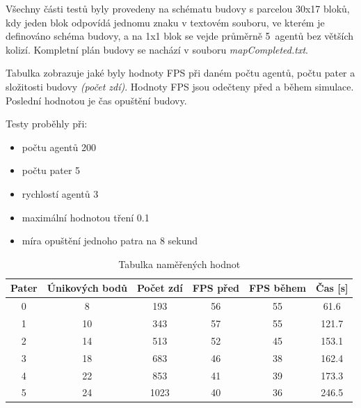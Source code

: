 \documentclass[czech,public,dept460,male,cpdeclaration]{diploma}
\begin{document}
Všechny části testů byly provedeny na schématu budovy s parcelou 30x17 bloků, kdy jeden blok odpovídá jednomu znaku v textovém souboru, ve kterém je definováno schéma budovy, a na 1x1 blok se vejde průměrně 5~agentů bez větších kolizí. Kompletní plán budovy se nachází v souboru \textit{mapCompleted.txt}.

Tabulka zobrazuje jaké byly hodnoty FPS při daném počtu agentů, počtu pater a složitosti budovy \textit{(počet zdí)}. Hodnoty FPS jsou odečteny před a během simulace. Poslední hodnotou je čas opuštění budovy.


Testy proběhly při:

\begin{itemize}
	\item počtu agentů 200
	\item počtu pater 5
	\item rychlostí agentů 3
	\item maximální hodnotou tření 0.1 
	\item míra opuštění jednoho patra na 8 sekund
\end{itemize}


\begin{table}[H]
	\centering
	\caption{Tabulka naměřených hodnot}
	\label{tab:tablePC2}
	\renewcommand{\arraystretch}{1.0}
	\begin{tabular}{| c | c | c | c | c | c |}
		\hline
		Pater  & Únikových bodů & Počet zdí & FPS před & FPS během & Čas [s]\\\hline
		0 & 8 & 193 & 56 & 55 & 61.6\\
		1 & 10 & 343 & 57 & 55 & 121.7\\
		2 & 14 & 513 & 52 & 45 & 153.1\\
		3 & 18 & 683 & 46 & 38 & 162.4\\
		4 & 22 & 853 & 41 & 39 & 173.3\\
		5 & 24 & 1023 & 40 & 36 & 246.5\\
		\hline
	\end{tabular}
\end{table}
\end{document}
